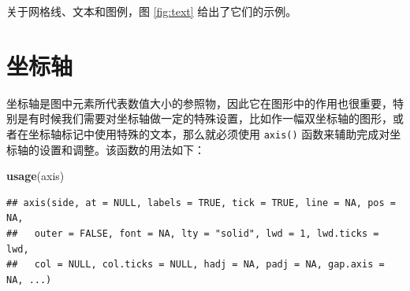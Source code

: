 \documentclass[
  b5paper,
  UTF8,twoside]{book}
\newenvironment{Shaded}{\begin{snugshade}}{\end{snugshade}}
\newcommand{\FunctionTok}[1]{\textcolor[rgb]{0.13,0.29,0.53}{\textbf{#1}}}
\newcommand{\NormalTok}[1]{#1}
\begin{document}
关于网格线、文本和图例，图 \ref{fig:text} 给出了它们的示例。

\section{坐标轴}\label{sec:axis}

坐标轴是图中元素所代表数值大小的参照物，因此它在图形中的作用也很重要，特别是有时候我们需要对坐标轴做一定的特殊设置，比如作一幅双坐标轴的图形，或者在坐标轴标记中使用特殊的文本，那么就必须使用 \texttt{axis()} 函数来辅助完成对坐标轴的设置和调整。该函数的用法如下：

\begin{Shaded}
\begin{Highlighting}[]
\FunctionTok{usage}\NormalTok{(axis)}
\end{Highlighting}
\end{Shaded}

\begin{verbatim}
## axis(side, at = NULL, labels = TRUE, tick = TRUE, line = NA, pos = NA,
##   outer = FALSE, font = NA, lty = "solid", lwd = 1, lwd.ticks = lwd,
##   col = NULL, col.ticks = NULL, hadj = NA, padj = NA, gap.axis = NA, ...)
\end{verbatim}
\end{document}
